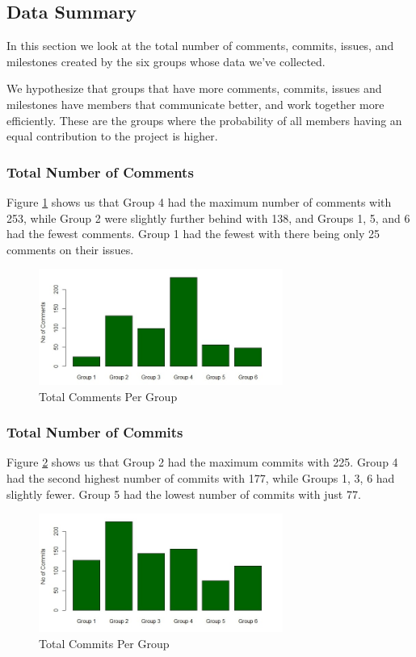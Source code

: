 \documentclass{acm_proc_article-sp}
\begin{document}
\subsection{Data Summary}

In this section we look at the total number of comments, commits, issues, and milestones created by the six groups whose data we've collected.

We hypothesize that groups that have more comments, commits, issues and milestones have members that communicate better, and work together more efficiently. These are the groups where the probability of all members having an equal contribution to the project is higher.

\subsubsection{Total Number of Comments}
Figure \ref{fig:grComment} shows us that Group 4 had the maximum number of comments with 253, while Group 2 were slightly further behind with 138, and Groups 1, 5, and 6 had the fewest comments. Group 1 had the fewest with there being only 25 comments on their issues. 

\begin{figure}[h]
\centering
\includegraphics[width=8cm]{img/grComment}
\caption{Total Comments Per Group}
\label{fig:grComment}
\end{figure}

\subsubsection{Total Number of Commits}
Figure \ref{fig:grCommit} shows us that Group 2 had the maximum commits with 225. Group 4 had the second highest number of commits with 177, while Groups 1, 3, 6 had slightly fewer. Group 5 had the lowest number of commits with just 77. 

\begin{figure}[h]
\centering
\includegraphics[width=8cm]{img/grCommit}
\caption{Total Commits Per Group}
\label{fig:grCommit}
\end{figure}
\end{document}
